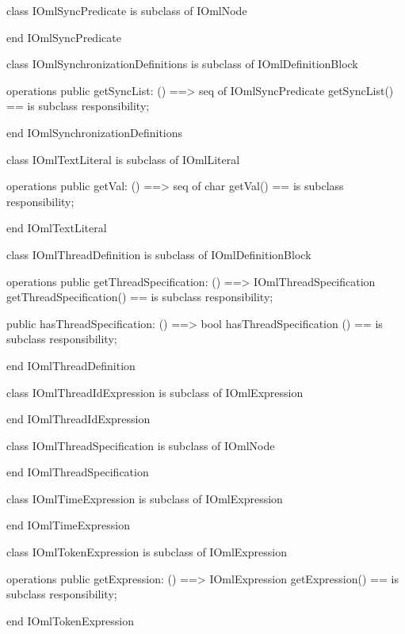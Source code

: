 \begin{vdm_al}
class IOmlSyncPredicate
 is subclass of IOmlNode

end IOmlSyncPredicate
\end{vdm_al}

\begin{vdm_al}
class IOmlSynchronizationDefinitions
 is subclass of IOmlDefinitionBlock

operations
  public getSyncList: () ==> seq of IOmlSyncPredicate
  getSyncList() == is subclass responsibility;

end IOmlSynchronizationDefinitions
\end{vdm_al}

\begin{vdm_al}
class IOmlTextLiteral
 is subclass of IOmlLiteral

operations
  public getVal: () ==> seq of char
  getVal() == is subclass responsibility;

end IOmlTextLiteral
\end{vdm_al}

\begin{vdm_al}
class IOmlThreadDefinition
 is subclass of IOmlDefinitionBlock

operations
  public getThreadSpecification: () ==> IOmlThreadSpecification
  getThreadSpecification() == is subclass responsibility;

  public hasThreadSpecification: () ==> bool
  hasThreadSpecification () == is subclass responsibility;

end IOmlThreadDefinition
\end{vdm_al}

\begin{vdm_al}
class IOmlThreadIdExpression
 is subclass of IOmlExpression

end IOmlThreadIdExpression
\end{vdm_al}

\begin{vdm_al}
class IOmlThreadSpecification
 is subclass of IOmlNode

end IOmlThreadSpecification
\end{vdm_al}

\begin{vdm_al}
class IOmlTimeExpression
 is subclass of IOmlExpression

end IOmlTimeExpression
\end{vdm_al}

\begin{vdm_al}
class IOmlTokenExpression
 is subclass of IOmlExpression

operations
  public getExpression: () ==> IOmlExpression
  getExpression() == is subclass responsibility;

end IOmlTokenExpression
\end{vdm_al}

